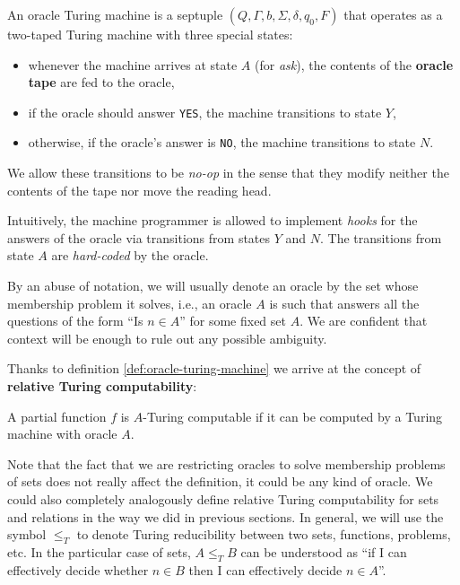 \documentclass[../main.tex]{memoir}
\begin{document}
\begin{definition}
  \label{def:oracle-turing-machine}
  An oracle Turing machine is a septuple $(Q, \Gamma, b, \Sigma, \delta, q_0, F)$ that operates as a two-taped Turing machine with three special states:

  \begin{itemize}
  \item whenever the machine arrives at state $A$ (for \textit{ask}), the contents of the \textbf{oracle tape} are fed to the oracle,
  \item if the oracle should answer \texttt{YES}, the machine transitions to state $Y$,
  \item otherwise, if the oracle's answer is \texttt{NO}, the machine transitions to state $N$.
  \end{itemize}

  We allow these transitions to be \textit{no-op} in the sense that they modify neither the contents of the tape nor move the reading head.
\end{definition}

\begin{remark}
  Intuitively, the machine programmer is allowed to implement \textit{hooks} for the answers of the oracle via transitions from states $Y$ and $N$. The transitions from state $A$ are \textit{hard-coded} by the oracle.
\end{remark}

By an abuse of notation, we will usually denote an oracle by the set whose membership problem it solves, i.e., an oracle $A$ is such that answers all the questions of the form ``Is $n \in A$'' for some fixed set $A$. We are confident that context will be enough to rule out any possible ambiguity.

Thanks to definition \ref{def:oracle-turing-machine} we arrive at the concept of \textbf{relative Turing computability}:

\begin{definition}
  A partial function $f$ is $A$-Turing computable if it can be computed by a Turing machine with oracle $A$.
\end{definition}

Note that the fact that we are restricting oracles to solve membership problems of sets does not really affect the definition, it could be any kind of oracle. We could also completely analogously define relative Turing computability for sets and relations in the way we did in previous sections. In general, we will use the symbol $\le_T$ to denote Turing reducibility between two sets, functions, problems, etc. In the particular case of sets, $A \le_T B$ can be understood as ``if I can effectively decide whether $n \in B$ then I can effectively decide $n \in A$''.
\end{document}
